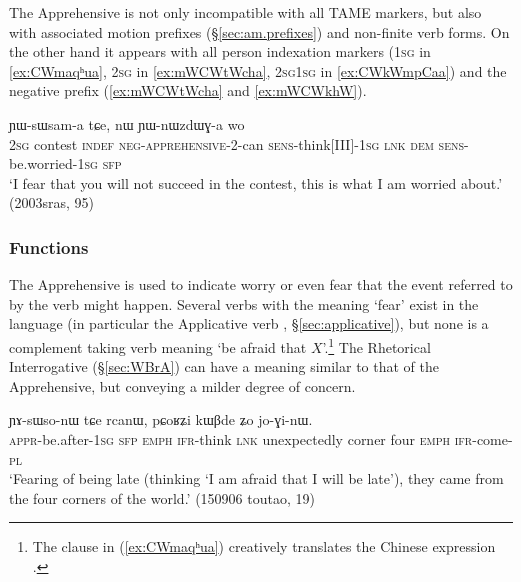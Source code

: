 The Apprehensive is not only incompatible with all TAME markers, but also with associated motion prefixes (§\ref{sec:am.prefixes}) and non-finite verb forms. On the other hand it appears with all person indexation markers (\textsc{1sg} in \ref{ex:CWmaqʰua}, \textsc{2sg} in \ref{ex:mWCWtWcha}, 2\textsc{sg}\fl{}1\textsc{sg} in \ref{ex:CWkWmpCaa}) and the negative prefix  (\ref{ex:mWCWtWcha} and \ref{ex:mWCWkhW}). 

  \begin{exe}
\ex \label{ex:mWCWtWcha}
 ɲɯ-sɯsam-a tɕe, nɯ ɲɯ-nɯzdɯɣ-a wo \\
\textsc{2sg} contest \textsc{indef} \textsc{neg}-\textsc{apprehensive}-2-can \textsc{sens}-think[III]-\textsc{1sg} \textsc{lnk} \textsc{dem} \textsc{sens}-be.worried-\textsc{1sg} \textsc{sfp} \\
\glt  `I fear that you will not succeed in the contest, this is what I am worried about.' (2003sras, 95)
 \end{exe}

\subsubsection{Functions} \label{sec:apprehensive.function}
The Apprehensive is used to indicate worry or even fear that the event referred to by the verb might happen. Several verbs with the meaning `fear' exist in the language (in particular the Applicative verb , §\ref{sec:applicative}), but none is a complement taking verb meaning `be afraid that $X$'.\footnote{The clause     in (\ref{ex:CWmaqʰua}) creatively translates the Chinese expression . }     The Rhetorical Interrogative (§\ref{sec:WBrA}) can have a meaning similar to that of the Apprehensive, but conveying a milder degree of concern.

\begin{exe}
\ex \label{ex:CWmaqʰua}
\gll  [ɕɯ-maqʰu-a kɯ ʑo] ɲɤ-sɯso-nɯ tɕe rcanɯ, pɕoʁʑi kɯβde ʑo jo-ɣi-nɯ.  \\
\textsc{appr}-be.after-\textsc{1sg} \textsc{sfp} \textsc{emph} \textsc{ifr}-think \textsc{lnk} unexpectedly corner four \textsc{emph} \textsc{ifr}-come-\textsc{pl} \\
\glt `Fearing of being late (thinking `I am afraid that I will be late'), they came from the four corners of the world.' (150906 toutao, 19)
 \end{exe}
 
